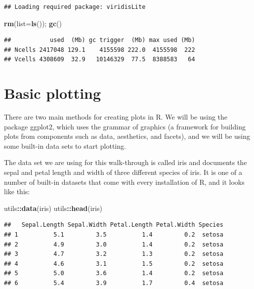 \documentclass[
]{book}
\newenvironment{Shaded}{\begin{snugshade}}{\end{snugshade}}
\newcommand{\AttributeTok}[1]{\textcolor[rgb]{0.13,0.29,0.53}{#1}}
\newcommand{\FunctionTok}[1]{\textcolor[rgb]{0.13,0.29,0.53}{\textbf{#1}}}
\newcommand{\NormalTok}[1]{#1}
\newcommand{\SpecialCharTok}[1]{\textcolor[rgb]{0.81,0.36,0.00}{\textbf{#1}}}
\begin{document}
\begin{verbatim}
## Loading required package: viridisLite
\end{verbatim}

\begin{Shaded}
\begin{Highlighting}[]
\FunctionTok{rm}\NormalTok{(}\AttributeTok{list=}\FunctionTok{ls}\NormalTok{()); }\FunctionTok{gc}\NormalTok{()}
\end{Highlighting}
\end{Shaded}

\begin{verbatim}
##           used  (Mb) gc trigger  (Mb) max used (Mb)
## Ncells 2417048 129.1    4155598 222.0  4155598  222
## Vcells 4308609  32.9   10146329  77.5  8388583   64
\end{verbatim}

\section{Basic plotting}\label{basic-plotting}

There are two main methods for creating plots in R. We will be using the package ggplot2, which uses the grammar of graphics (a framework for building plots from components such as data, aesthetics, and facets), and we will be using some built-in data sets to start plotting.

The data set we are using for this walk-through is called iris and documents the sepal and petal length and width of three different species of iris. It is one of a number of built-in datasets that come with every installation of R, and it looks like this:

\begin{Shaded}
\begin{Highlighting}[]
\NormalTok{utils}\SpecialCharTok{::}\FunctionTok{data}\NormalTok{(iris)  }
\NormalTok{utils}\SpecialCharTok{::}\FunctionTok{head}\NormalTok{(iris) }
\end{Highlighting}
\end{Shaded}

\begin{verbatim}
##   Sepal.Length Sepal.Width Petal.Length Petal.Width Species
## 1          5.1         3.5          1.4         0.2  setosa
## 2          4.9         3.0          1.4         0.2  setosa
## 3          4.7         3.2          1.3         0.2  setosa
## 4          4.6         3.1          1.5         0.2  setosa
## 5          5.0         3.6          1.4         0.2  setosa
## 6          5.4         3.9          1.7         0.4  setosa
\end{verbatim}
\end{document}
